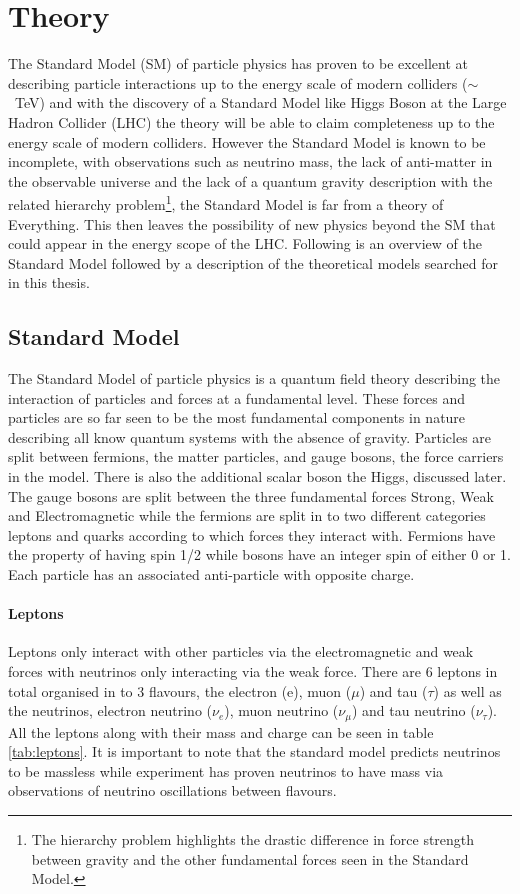 \chapter{Theory}

    The Standard Model (SM) of particle physics has proven to be excellent at describing particle interactions up to the energy scale of modern colliders ($\sim$~TeV) and with the discovery of a Standard Model like Higgs Boson at the Large Hadron Collider (LHC) the theory will be able to claim completeness up to the energy scale of modern colliders. However the Standard Model is known to be incomplete, with observations such as neutrino mass, the lack of anti-matter in the observable universe and the lack of a quantum gravity description with the related hierarchy problem\footnote{The hierarchy problem highlights the drastic difference in force strength between gravity and the other fundamental forces seen in the Standard Model.}, the Standard Model is far from a theory of Everything. This then leaves the possibility of new physics beyond the SM that could appear in the energy scope of the LHC.
    Following is an overview of the Standard Model \cite{ulrik:GriffEP2008} followed by a description of the theoretical models searched for in this thesis. 

\section{Standard Model}
    
    The Standard Model of particle physics is a quantum field theory describing the interaction of particles and forces at a fundamental level. These forces and particles are so far seen to be the most fundamental components in nature describing all know quantum systems with the absence of gravity. Particles are split between fermions, the matter particles, and gauge bosons, the force carriers in the model. There is also the additional scalar boson the Higgs, discussed later. The gauge bosons are split between the three fundamental forces Strong, Weak and Electromagnetic while the fermions are split in to two different categories leptons and quarks according to which forces they interact with. Fermions have the property of having spin 1/2 while bosons have an integer spin of either 0 or 1. Each particle has an associated anti-particle with opposite charge. 

    \subsubsection*{Leptons}
    Leptons only interact with other particles via the electromagnetic and weak forces with neutrinos only interacting via the weak force. There are 6 leptons in total organised in to 3 flavours, the electron (e), muon ($\mu$) and tau ($\tau$) as well as the neutrinos, electron neutrino ($\nu_{e}$), muon neutrino ($\nu_{\mu}$) and tau neutrino ($\nu_{\tau}$). All the leptons along with their mass and charge can be seen in table \ref{tab:leptons}. It is important to note that the standard model predicts neutrinos to be massless while experiment has proven neutrinos to have mass via observations of neutrino oscillations between flavours. 


